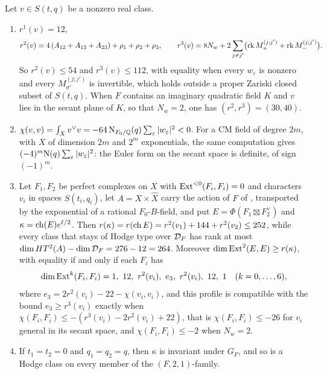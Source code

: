 \begin{proposition}\label{prop:sexticcount}
Let $v\in S(t,q)$ be a nonzero real class.
\begin{enumerate}[label=\textup{(\roman*)},leftmargin=2.6em,itemsep=2pt]
\item $r^{1}(v)=12$,
  \[
    r^{2}(v)=4\,(A_{12}+A_{13}+A_{23})+\rho_{1}+\rho_{2}+\rho_{3},
    \qquad
    r^{3}(v)=8N_{w}+2\sum_{j\ne j'}\bigl(\operatorname{rk} M^{(j;j')}_{+}+\operatorname{rk} M^{(j;j')}_{-}\bigr).
  \]
  So $r^{2}(v)\le54$ and $r^{3}(v)\le112$, with equality when every
  $w_{\varepsilon}$ is nonzero and every $M^{(j;j')}_{\sigma'}$ is invertible,
  which holds outside a proper Zariski closed subset of $S(t,q)$. When $F$
  contains an imaginary quadratic field $K$ and $v$ lies in the secant plane
  of $K$, so that $N_{w}=2$, one has $(r^{2},r^{3})=(30,40)$.
\item $\chi(v,v)=\int_{X}v^{\vee}v=-64\,\mathrm{N}_{F_{0}/\mathbb{Q}}(q)\sum_{\varepsilon}
  |w_{\varepsilon}|^{2}<0$. For a CM field of degree $2m$, with $X$ of dimension
  $2m$ and $2^{m}$ exponentials, the same computation gives
  $(-4)^{m}\mathrm{N}(q)\sum_{\varepsilon}|w_{\varepsilon}|^{2}$: the Euler form on
  the secant space is definite, of sign $(-1)^{m}$.
\item Let $F_{1},F_{2}$ be perfect complexes on $X$ with
  $\operatorname{Ext}^{<0}(F_{i},F_{i})=0$ and characters $v_{i}$ in spaces
  $S(t_{i},q_{i})$, let $A=X\times\widehat{X}$ carry the action of $F$ of
  \cite[\S11.1]{Mar25c}, transported by the exponential of a rational
  $F_{0}$-$B$-field, and put
  $E=\Phi(F_{1}\boxtimes F_{2}^{\vee})$ and $\kappa=\operatorname{ch}(E)e^{\ell/2}$. Then
  $r(\kappa)=r(\operatorname{ch} E)=r^{2}(v_{1})+144+r^{2}(v_{2})\le252$, while every class
  that stays of Hodge type over $\mathcal{D}_{F}$ has rank at most
  $\dim HT^{2}(A)-\dim\mathcal{D}_{F}=276-12=264$. Moreover
  $\dim\operatorname{Ext}^{2}(E,E)\ge r(\kappa)$, with equality if and only if each $F_{i}$
  has
  \[
    \dim\Ext^{k}(F_{i},F_{i})=1,\ 12,\ r^{2}(v_{i}),\ e_{3},\ r^{2}(v_{i}),\ 12,\ 1
    \quad(k=0,\dots,6),
  \]
  where $e_{3}=2r^{2}(v_{i})-22-\chi(v_{i},v_{i})$,
  and this profile is compatible with the bound $e_{3}\ge r^{3}(v_{i})$ exactly
  when $\chi(F_{i},F_{i})\le-(r^{3}(v_{i})-2r^{2}(v_{i})+22)$, that is
  $\chi(F_{i},F_{i})\le-26$ for $v_{i}$ general in its secant space, and
  $\chi(F_{i},F_{i})\le-2$ when $N_{w}=2$.
\item If $t_{1}=t_{2}=0$ and $q_{1}=q_{2}=q$, then $\kappa$ is invariant
  under $G_{F}$, and so is a Hodge class on every member of the
  $(F,2,1)$-family.
\end{enumerate}
\end{proposition}

